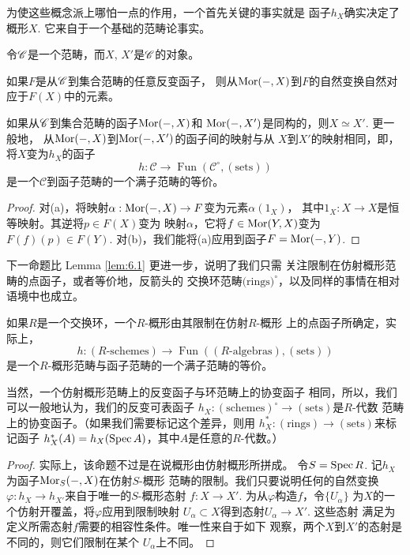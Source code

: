 为使这些概念派上哪怕一点的作用，一个首先关键的事实就是
函子$h_X$确实决定了概形$X$. 它来自于一个基础的范畴论事实。

\begin{lem}[Yoneda引理]\label{lem:6.1}
令$\mathscr{C}$是一个范畴，而$X$, $X'$是$\mathscr{C}$的对象。
\begin{compactenum}[(\rm a)]
\item 如果$F$是从$\mathscr{C}$到集合范畴的任意反变函子，
则从$\operatorname{Mor}(-,X)$到$F$的自然变换自然对应于$F(X)$中的元素。
\item 如果从$\mathscr{C}$到集合范畴的函子$\operatorname{Mor}(-,X)$和
$\operatorname{Mor}(-,X')$是同构的，则$X\simeq X'$. 更一般地，
从$\operatorname{Mor}(-,X)$到$\operatorname{Mor}(-,X')$的函子间的映射与从
$X$到$X'$的映射相同，即，将$X$变为$h_X$的函子
\[
	h:\mathscr C\to \operatorname{Fun}
	(\mathscr C^\circ,(\text{sets}))
\]
是一个$\mathscr C$到函子范畴的一个满子范畴的等价。
\end{compactenum}
\end{lem}

\begin{proof}
对(a)，将映射$\alpha:\operatorname{Mor}(-,X)\to F$变为元素$\alpha(1_X)$，
其中$1_X:X\to X$是恒等映射。其逆将$p\in F(X)$变为
映射$\alpha$，它将$f\in \operatorname{Mor}(Y,X)$变为$F(f)(p)\in F(Y)$. 
对(b)，我们能将(a)应用到函子$F=\operatorname{Mor}(-,Y)$.
\end{proof}

下一命题比 Lemma \ref{lem:6.1} 更进一步，说明了我们只需
关注限制在仿射概形范畴的点函子，或者等价地，反箭头的
交换环范畴$\text{(rings)}^\circ$，以及同样的事情在相对
语境中也成立。

\begin{pro}\label{pro:6.2}
如果$R$是一个交换环，一个$R$-概形由其限制在仿射$R$-概形
上的点函子所确定，实际上，
\[
	h:(\text{$R$-schemes})\to \operatorname{Fun}
	((\text{$R$-algebras}),(\text{sets}))
\]
是一个$R$-概形范畴与函子范畴的一个满子范畴的等价。
\end{pro}

当然，一个仿射概形范畴上的反变函子与环范畴上的协变函子
相同，所以，我们可以一般地认为，我们的反变可表函子
$h_X:(\text{schemes})^\circ \to (\text{sets})$是$R$-代数
范畴上的协变函子。（如果我们需要标记这个差异，则用
$h_X^*:(\text{rings})\to (\text{sets})$来标记函子
$h_X^*(A)=h_X(\operatorname{Spec} A)$，其中$A$是任意的$R$-代数。）

\begin{proof}
实际上，该命题不过是在说概形由仿射概形所拼成。
令$S=\operatorname{Spec} R$. 记$h_X$为函子$\operatorname{Mor}_S(-,X)$在仿射$S$-概形
范畴的限制。我们只要说明任何的自然变换
$\varphi:h_X\to h_{X'}$来自于唯一的$S$-概形态射
$f:X\to X'$. 为从$\varphi$构造$f$，令$\{U_\alpha\}$
为$X$的一个仿射开覆盖，将$\varphi$应用到限制映射
$U_\alpha\subset X$得到态射$U_\alpha\to X'$. 这些态射
满足为定义所需态射$f$需要的相容性条件。唯一性来自于如下
观察，两个$X$到$X'$的态射是不同的，则它们限制在某个
$U_\alpha$上不同。
\end{proof}


